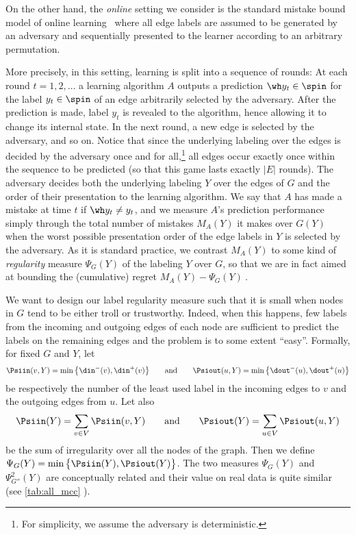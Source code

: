 On the other hand, the \emph{online} setting we consider is the standard mistake bound model of
online learning~\autocite{Winnow88} where all edge labels are assumed to be generated by an
adversary and sequentially presented to the learner according to an arbitrary permutation.
\iffalse
For an
online learning algorithm $A$, we are interested in measuring the total number of mistakes $M_A(Y)$
the algorithm makes over $G(Y)$ when the worst possible presentation order of the edge labels in
$Y$ is selected by the adversary.
\fi
More precisely,
  in this setting, learning is split into a sequence of rounds: At each round $t=1,2,\ldots$ a
  learning algorithm $A$ outputs a prediction ${\wh y_t} \in \spin$ for the label $y_t \in \spin$
  of an edge arbitrarily selected by the adversary. After the prediction is made, label $y_t$ is
  revealed to the algorithm, hence allowing it to change its internal state. In the next round, a
  new edge is selected by the adversary, and so on. Notice that since the underlying labeling over
  the edges is decided by the adversary once and for all,\footnote{For simplicity, we assume the
  adversary is deterministic.} all edges occur exactly once within the sequence to be predicted (so
  that this game lasts exactly $|E|$ rounds). The adversary decides both the underlying labeling
  $Y$ over the edges of $G$ and the order of their presentation to the learning algorithm. We say
  that $A$ has made a mistake at time $t$ if ${\wh y_t} \neq y_t$, and we measure $A$'s prediction
  performance simply through the total number of mistakes $M_A(Y)$ it makes over $G(Y)$ when the
  worst possible presentation order of the edge labels in $Y$ is selected by the adversary. As it is
  standard practice, we contrast $M_A(Y)$ to some kind of \emph{regularity} measure $\Psi_G(Y)$ of the
  labeling $Y$ over $G$, so that we are in fact aimed at bounding the (cumulative) regret \( M_A(Y)
  - \Psi_G(Y)~.\)

We want to design our label regularity measure such that it is small when
nodes in $G$ tend to be either troll or trustworthy. Indeed, when this happens, few labels from the
incoming and outgoing edges of each node are sufficient to predict the labels on the remaining
edges and the \esp{} problem is to some extent \enquote{easy}. Formally, for fixed $G$ and $Y$, let 
$$
\Psiin(v,Y) = \min\big\{\din^-(v),\din^+(v)\big\}
\qquad\text{and}\qquad
\Psiout(u,Y) = \min\big\{\dout^-(u),\dout^+(u)\big\}
$$
be respectively the number of the least used label in the incoming edges to $v$ and the outgoing
edges from $u$.
Let also
$$
\Psiin(Y) = \sum_{v \in V} \Psiin(v,Y)
\qquad\text{and}\qquad
\Psiout(Y) = \sum_{u \in V} \Psiout(u,Y)
$$
be the sum of irregularity over all the nodes of the graph.
Then we define $\Psi_G(Y) = \min\big\{\Psiin(Y),\Psiout(Y)\big\}$. The two measures
$\Psi_G(Y)$ and $\Psi^2_{G''}(Y)$ are conceptually related and their value on real data is quite
similar (see \autoref{tab:all_mcc} ).

